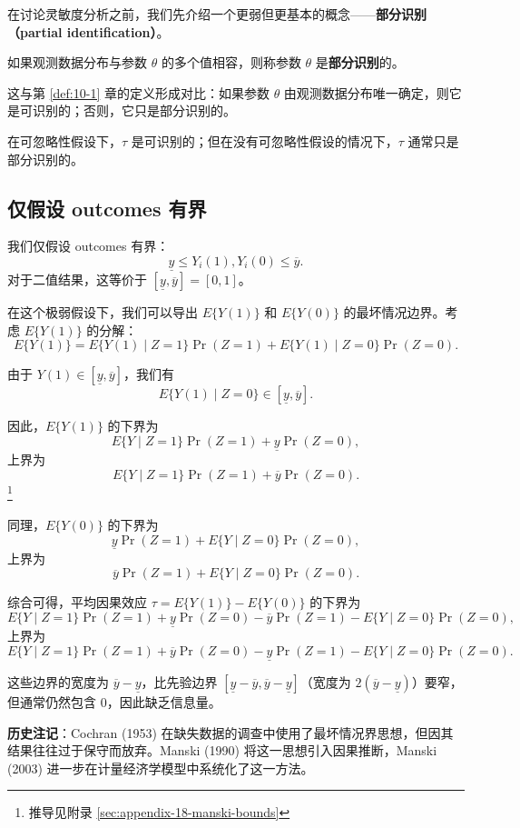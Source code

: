 在讨论灵敏度分析之前，我们先介绍一个更弱但更基本的概念——\textbf{部分识别（partial identification）}。

\begin{Definition}[部分识别]\label{def:18-partial-id}
如果观测数据分布与参数 $\theta$ 的多个值相容，则称参数 $\theta$ 是\textbf{部分识别}的。
\end{Definition}

这与第 \ref{def:10-1} 章的定义形成对比：如果参数 $\theta$ 由观测数据分布唯一确定，则它是可识别的；否则，它只是部分识别的。

在可忽略性假设下，$\tau$ 是可识别的；但在没有可忽略性假设的情况下，$\tau$ 通常只是部分识别的。

\subsection{仅假设 outcomes 有界}\label{sec:18-bounded-outcomes}

我们仅假设 outcomes 有界：
\[
\underline{y} \leq Y_i(1), Y_i(0) \leq \overline{y} .
\]
对于二值结果，这等价于 $[\underline{y}, \overline{y}] = [0, 1]$。

在这个极弱假设下，我们可以导出 $E\{Y(1)\}$ 和 $E\{Y(0)\}$ 的最坏情况边界。考虑 $E\{Y(1)\}$ 的分解：
\[
E\{Y(1)\} = E\{Y(1) \mid Z=1\}\Pr(Z=1) + E\{Y(1) \mid Z=0\}\Pr(Z=0) .
\]

由于 $Y(1) \in [\underline{y}, \overline{y}]$，我们有
\[
E\{Y(1) \mid Z=0\} \in [\underline{y}, \overline{y}] .
\]

因此，$E\{Y(1)\}$ 的下界为
\[
E\{Y \mid Z=1\}\Pr(Z=1) + \underline{y}\Pr(Z=0) ,
\]
上界为
\[
E\{Y \mid Z=1\}\Pr(Z=1) + \overline{y}\Pr(Z=0) .
\]\footnote{推导见附录 \cref{sec:appendix-18-manski-bounds}}

同理，$E\{Y(0)\}$ 的下界为
\[
\underline{y}\Pr(Z=1) + E\{Y \mid Z=0\}\Pr(Z=0) ,
\]
上界为
\[
\overline{y}\Pr(Z=1) + E\{Y \mid Z=0\}\Pr(Z=0) .
\]

综合可得，平均因果效应 $\tau = E\{Y(1)\} - E\{Y(0)\}$ 的下界为
\[
E\{Y \mid Z=1\}\Pr(Z=1) + \underline{y}\Pr(Z=0) - \overline{y}\Pr(Z=1) - E\{Y \mid Z=0\}\Pr(Z=0) ,
\]
上界为
\[
E\{Y \mid Z=1\}\Pr(Z=1) + \overline{y}\Pr(Z=0) - \underline{y}\Pr(Z=1) - E\{Y \mid Z=0\}\Pr(Z=0) .
\]

这些边界的宽度为 $\overline{y} - \underline{y}$，比先验边界 $[\underline{y} - \overline{y}, \overline{y} - \underline{y}]$（宽度为 $2(\overline{y} - \underline{y})$）要窄，但通常仍然包含 0，因此缺乏信息量。

\textbf{历史注记}：Cochran (1953) 在缺失数据的调查中使用了最坏情况界思想，但因其结果往往过于保守而放弃。Manski (1990) 将这一思想引入因果推断，Manski (2003) 进一步在计量经济学模型中系统化了这一方法。

